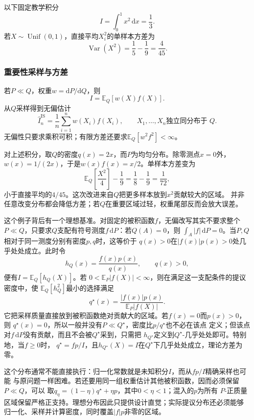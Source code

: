 以下固定教学积分
\[ I=\int_0^1x^2\,\mathrm{d}x=\frac13. \]
若\(X\sim\operatorname{Unif}(0,1)\)，直接平均\(X_i^2\)的单样本方差为
\[ \operatorname{Var}(X^2)
  =\frac15-\frac19=\frac{4}{45}. \]

\subsubsection{重要性采样与方差}

若\(P\ll Q\)，权重\(w=\mathrm{d}P/\mathrm{d}Q\)，则
\[ I=\mathbb{E}_Q[w(X)f(X)]. \]
从\(Q\)采样得到无偏估计
\begin{equation}
  \widehat{I}^{\mathrm{IS}}_n
  =
  \frac{1}{n}\sum_{i=1}^{n}w(X_i)f(X_i),
  \qquad X_1,\ldots,X_n\text{独立同分布于 }Q.
  \label{eq:probability-importance-sampling}
\end{equation}
无偏性只要求乘积可积；有限方差还要求\(\mathbb{E}_Q[w^2f^2]<\infty\)。

对上述积分，取\(Q\)的密度\(q(x)=2x\)，而\(P\)为均匀分布。除零测点\(x=0\)外，\(w(x)=1/(2x)\)，于是\(w(x)f(x)=x/2\)。单样本方差变为
\[ \mathbb{E}_Q\left[\frac{X^2}{4}\right]-\frac19
  =\frac18-\frac19=\frac{1}{72}, \]
小于直接平均的\(4/45\)。这次改进来自\(Q\)把更多样本放到\(x^2\)贡献较大的区域。
并非任意改变分布都会降低方差；若\(Q\)在重要区域过轻，权重尾部反而会放大误差。

这个例子背后有一个理想基准。对固定的被积函数\(f\)，无偏改写其实不要求整个
\(P\ll Q\)，只要求\(Q\)支配有符号测度\(f\,\mathrm{d}P\)：若\(Q(A)=0\)，则
\(\int_A|f|\,\mathrm{d}P=0\)。当\(P,Q\)相对于同一测度分别有密度\(p,q\)时，这等价于
\(q(x)>0\)在\(|f(x)|p(x)>0\)处几乎处处成立。此时令
\[
  h_Q(x)=\frac{f(x)p(x)}{q(x)},\qquad q(x)>0,
\]
便有\(I=\mathbb{E}_Q[h_Q(X)]\)。若
\(0<\mathbb{E}_P|f(X)|<\infty\)，则在满足这一支配条件的提议密度中，使
\(\mathbb{E}_Q[h_Q^2]\)最小的选择满足
\[
  q^\star(x)
  =
  \frac{|f(x)|p(x)}{\mathbb{E}_P|f(X)|}.
\]
它把采样质量直接放到被积函数绝对贡献大的区域。若\(f(x)=0\)而\(p(x)>0\)，则
\(q^\star(x)=0\)，所以一般并没有\(P\ll Q^\star\)，密度比\(p/q^\star\)也不必在该点
定义；但该点对\(f\,\mathrm{d}P\)没有贡献，而且不会被\(Q^\star\)采到，只需把
\(h_{Q^\star}\)定义到\(Q^\star\)-几乎处处即可。特别地，当\(f\geq0\)时，
\(q^\star=fp/I\)，且\(h_{Q^\star}(X)=I\)在\(Q^\star\)下几乎处处成立，理论方差为零。

这个分布通常不能直接执行：归一化常数就是未知积分\(I\)，而从\(fp/I\)精确采样也可能
与原问题一样困难。若还要用同一组权重估计其他被积函数，因而必须保留\(P\ll Q\)，可以
取\(q_\eta=(1-\eta)q^\star+\eta p\)，其中\(0<\eta<1\)；混入的\(p\)为所有
\(P\)-正质量区域保留严格正支持。理想分布因此只提供设计直觉；实际提议分布还必须能够
归一化、采样并计算密度，同时覆盖\(|f|p\)非零的区域。

